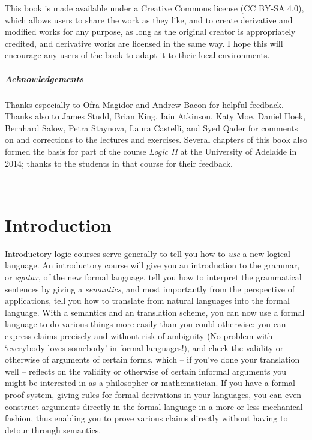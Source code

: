 \documentclass[openany,leqno,11pt]{book}
\theoremstyle{break}
\theoremstyle{definition}
\theoremstyle{remark}
\begin{document}
This book is made available under a Creative Commons license (CC BY-SA 4.0), which allows users to share the work as they like, and to create derivative and modified works for any purpose, as long as the original creator is appropriately credited, and derivative works are licensed in the same way. I hope this will encourage any users of the book to adapt it to their local environments.

\paragraph{Acknowledgements} Thanks especially to Ofra Magidor and Andrew Bacon for helpful feedback. Thanks also to James Studd, Brian King, Iain Atkinson, Katy Moe, Daniel Hoek, Bernhard Salow, Petra Staynova, Laura Castelli, and Syed Qader for comments on and corrections to the lectures and exercises. Several chapters of this book also formed the basis for part of the course \emph{Logic II} at the University of Adelaide in 2014; thanks to the students in that course for their feedback.


  

\newpage\tableofcontents{}
\listoftables\listoffigures




\newpage \thispagestyle{empty} ~\\\newpage


\setcounter{chapter}{-1}
\chapter{Introduction}

Introductory logic courses serve generally to tell you how to \emph{use} a new logical language. An introductory course will give you an introduction to the grammar, or \emph{syntax}, of the new formal language, tell you how to interpret the grammatical sentences by giving a \emph{semantics}, and most importantly from the perspective of applications, tell you how to translate from natural languages into the formal language. With a semantics and an translation scheme, you can now use a formal language to do various things more easily than you could otherwise: you can express claims precisely and without risk of ambiguity (No problem with `everybody loves somebody' in formal languages!), and check the validity or otherwise of arguments of certain forms, which – if you've done your translation well – reflects on the validity or otherwise of certain informal arguments you might be interested in as a philosopher or mathematician. If you have a formal proof system, giving rules for formal derivations in your languages, you can even construct arguments directly in the formal language in a more or less mechanical fashion, thus enabling you to prove various claims directly without having to detour through semantics.
\end{document}
